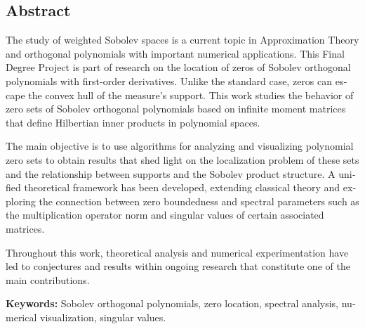 \begin{otherlanguage}{english}
  \chapter*{Abstract}

  The study of weighted Sobolev spaces is a current topic in Approximation Theory and orthogonal polynomials with important numerical applications. This Final Degree Project is part of research on the location of zeros of Sobolev orthogonal polynomials with first-order derivatives. Unlike the standard case, zeros can escape the convex hull of the measure's support. This work studies the behavior of zero sets of Sobolev orthogonal polynomials based on infinite moment matrices that define Hilbertian inner products in polynomial spaces.

  The main objective is to use algorithms for analyzing and visualizing polynomial zero sets to obtain results that shed light on the localization problem of these sets and the relationship between supports and the Sobolev product structure. A unified theoretical framework has been developed, extending classical theory and exploring the connection between zero boundedness and spectral parameters such as the multiplication operator norm and singular values of certain associated matrices.

  Throughout this work, theoretical analysis and numerical experimentation have led to conjectures and results within ongoing research that constitute one of the main contributions.

  \textbf{Keywords:} Sobolev orthogonal polynomials, zero location, spectral analysis, numerical visualization, singular values.

\end{otherlanguage}


